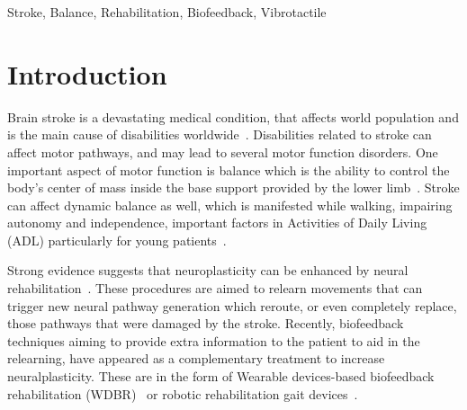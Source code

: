 \documentclass[conference]{IEEEtran}
\begin{document}
\maketitle


\begin{IEEEkeywords}
Stroke, Balance, Rehabilitation, Biofeedback, Vibrotactile
\end{IEEEkeywords}

\section{Introduction}

Brain stroke is a devastating medical condition, that affects world population and is the main cause of disabilities worldwide~\cite{Caplan.etal2023}.  Disabilities related to stroke can affect motor pathways, and may lead to several motor function disorders.   One important aspect of motor function is balance which is the ability to control the body's center of mass inside the base support provided by the lower limb~\cite{Bowman2021}.  Stroke can affect dynamic balance as well,  which is manifested while walking, impairing autonomy and independence, important factors in Activities of Daily Living (ADL) particularly for young patients~\cite{Afrasiabifar.etal2020,Donato.etal2016}.


Strong evidence suggests that neuroplasticity can be enhanced by neural rehabilitation~\cite{DeAngelis.etal2021,Albert.etal2012}.  These procedures are aimed to relearn movements that can trigger new neural pathway generation which reroute, or even completely replace, those pathways that were damaged by the stroke.   Recently, biofeedback techniques aiming to provide extra information to the patient to aid in the relearning, have appeared as a complementary treatment to increase neuralplasticity. These are in the form of Wearable devices-based biofeedback rehabilitation (WDBR)~\cite{Peake.etal2018} or robotic rehabilitation gait devices~\cite{Zhao.etal2022,Peshkin.etal2005,Tong.etal2006}.  
\end{document}
